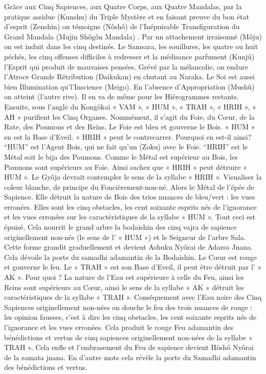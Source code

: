 Grâce aux Cinq Sapiences, aux Quatre Corps, aux Quatre Mandalas, par la pratique assidue  (Kunshu) du Triple Mystère et en faisant preuve du bon état d’esprit (Zenshin) on témoigne (Nôshô) de l’Inépuisable Transfiguration du Grand Mandala (Mujin Shôgôn Mandala) . Par un attachement irraisonné (Môju) on est induit dans les cinq destinés. Le Samsara, les souillures, les quatre ou huit péchés, les cinq offenses difficiles à redresser et la médisance parfument (Kunjû) l’Esprit qui produit de mauvaises pensées. Grévé par la mélancolie, on endure l’Atroce Grande Rétribution (Daikukan) en chutant au Naraka. Le Soi est aussi bien Illumination qu’l’Inscience (Meigo). En l’absence d’Appropriation (Mushû) on atteint (l’autre rive). Il en va de même pour les Hiérogrammes restants.
Ensuite, sous l’angle du Kongôkai « VAM », « HUM », « TRAH », « HRIH », « AH » purifient les Cinq Organes. Nommément, il s’agit du Foie, du Cœur, de la Rate, des Poumons et des Reins.
Le Foie est bleu et gouverne le Bois. « HUM » en est la Base d'Eveil. « HRIH » peut le contrecarrer. Pourquoi en est-il ainsi? “HUM” est l’Agent Bois, qui ne fait qu’un (Zoku) avec le Foie. “HRIH” est le Métal soit le bija des Poumons. Comme le Métal est supérieur au Bois, les Poumons sont supérieurs au Foie. Ainsi sachez que « HRIH » peut détruire « HUM ». Le Gyôja devrait contempler le sens de la syllabe « HRIH ». Visualiser la coleur blanche, de principe du Foncièrement-non-né. Alors le Métal de l’épée de Sapience. Elle détruit la nature de Bois des trios nuances de bleu/vert : les vues erronées. Elles sont les cinq obstacles, les cent soixante esprits nés de l’ignorance et les vues erronées sur les caractéristiques de la syllabe « HUM ». Tout ceci est épuisé.  Cela nourrit le grand arbre la bodaishin des cinq vajra de sapience originellement non-nés (le sens de l’ « HUM ») et le Seigneur de l’arbre Sala. Cette forme grandit graduellement et devient Ashuku Nyôrai de Adarsa Jnana. Cela dévoile la porte du samadhi adamantin de la Bodaishin.
Le Cœur est rouge et gouverne le feu. Le « TRAH » est son Base d'Eveil, il peut être détruit par l’ « AK ». Pour quoi ? La nature de l’Eau est supérieure à celle du Feu, ainsi les Reins sont supérieurs au Cœur, ainsi le sens de la syllabe « AK » détruit les caractéristiques de la syllabe « TRAH ». Conséquement avec  l’Eau noire des Cinq Sapiences originellement non-nées on douche le feu des trois nuances de rouge : les opinion fausses, c’est  à dire les cinq obstacles, les cent soixante esprits nés de l’ignorance et les vues erronées. Cela produit le rouge Feu adamantin des bénédictions et vertus de cinq sapiences originellement non-nées de la syllabe « TRAH ». Cela enfle et l’embrasement du Feu de sapience devient Hôshô Nyôrai de la samata jnana. En d’autre mots cela révèle la porte du Samadhi adamantin des bénédictions et vertus.
